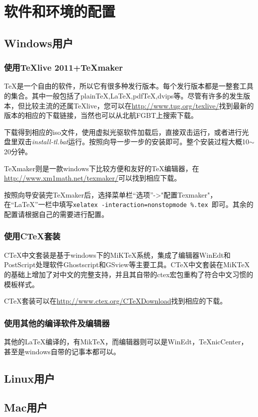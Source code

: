 \chapter{软件和环境的配置}
	\section{Windows用户}
		\subsection{使用\TeX{}live 2011+\TeX{}maker}
		\TeX{}是一个自由的软件，所以它有很多种发行版本。每个发行版本都是一整套工具的集合。其中一般包括了plainTeX,LaTeX,pdfTeX,dvips等。尽管有许多的发生版本，但比较主流的还属\TeX{}live，您可以在\url{http://www.tug.org/texlive/}找到最新的版本的相应的下载链接，当然也可以从北航FGBT上搜索下载。\par
		下载得到相应的iso文件，使用虚拟光驱软件加载后，直接双击运行，或者进行光盘里双击\textsl{install-tl.bat}运行。按照向导一步一步的安装即可。整个安装过程大概10$\sim$20分钟。\par
		\TeX{}maker则是一款windows下比较方便和友好的\TeX{}编辑器，在\url{http://www.xm1math.net/texmaker/}可以找到相应下载。\par
		按照向导安装完\TeX{}maker后，选择菜单栏“选项”->"配置Texmaker"，在“LaTeX”一栏中填写\texttt{xelatex -interaction=nonstopmode \%.tex}~即可。其余的配置请根据自己的需要进行配置。\par
		\subsection{使用C\TeX{}套装}
		C\TeX{}中文套装是基于windows下的MiKTeX系统，集成了编辑器WinEdt和PostScript处理软件Ghostscript和GSview等主要工具。C\TeX{}中文套装在MiKTeX的基础上增加了对中文的完整支持，并且其自带的ctex宏包重构了符合中文习惯的模板样式。\par
		C\TeX{}套装可以在\url{http://www.ctex.org/CTeXDownload}找到相应的下载。
		\subsection{使用其他的编译软件及编辑器}
		其他的\LaTeX{}编译的，有MikTeX，而编辑器则可以是WinEdt，TeXnicCenter，甚至是windows自带的记事本都可以。
	\section{Linux用户}
	\section{Mac用户}